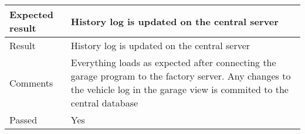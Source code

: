 \begin{table}[H]
\begin{tabularx}{1.0\textwidth}{
    |p{}     %
    |p{}|    %
}
Expected result
& History log is updated on the central server
\\
\hline

Result
& History log is updated on the central server
\\
\hline

Comments
& Everything loads as expected after connecting the garage program to the factory server. Any changes to the vehicle log in the garage view is commited to the central database
\\
\hline

Passed
& Yes
\\
\hline

\end{tabularx}
\end{table}


